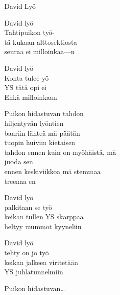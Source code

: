 \begin{song}{David Lyö}


    David lyö\\
    Tahtipuikon työ-\\
    tä kukaan alttosektiosta\\
    seuraa ei milloinkaa---n

    David lyö\\
    Kohta tulee yö\\
    YS tätä opi ei\\
    Ehkä milloinkaan

    Puikon hidastuvan tahdon\\
    hiljentyvän lyöntien\\
    baariin lähteä mä päätän\\
    tuopin huiviin kietaisen\\
    tahdon ennen kuin on myöhäistä, mä\\
    juoda sen\\
    ennen keskiviikkoa mä stemmaa\\
    treenaa en

    David lyö\\
    palkitaan se työ\\
    keikan tullen YS skarppaa\\
    heltyy mummot kyyneliin

    David lyö\\
    tehty on jo työ\\
    keikan jalkeen viritetään\\
    YS juhlatunnelmiin

    Puikon hidastuvan\dots

\end{song}